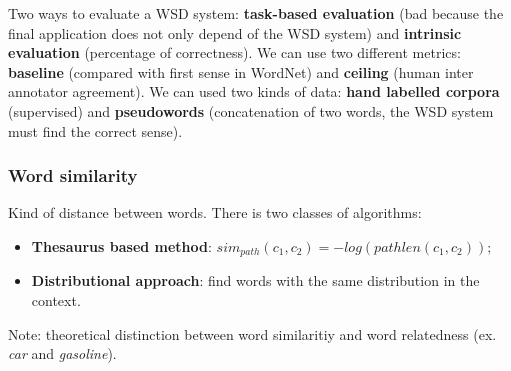 Two ways to evaluate a WSD system: \textbf{task-based evaluation} (bad because the final application does not only depend of the WSD system) and \textbf{intrinsic evaluation} (percentage of correctness). We can use two different metrics: \textbf{baseline} (compared with first sense in WordNet) and \textbf{ceiling} (human inter annotator agreement). We can used two kinds of data: \textbf{hand labelled corpora} (supervised) and \textbf{pseudowords} (concatenation of two words, the WSD system must find the correct sense).

\subsubsection{Word similarity}

Kind of distance between words. There is two classes of algorithms:
\begin{itemize}
	\item \textbf{Thesaurus based method}: $sim_{path}(c_1 , c_2) = - log (pathlen(c_1 ,c_2))$;
	\item \textbf{Distributional approach}: find words with the same distribution in the context.
\end{itemize}

Note: theoretical distinction between word similaritiy and word relatedness (ex. \textit{car} and \textit{gasoline}). 